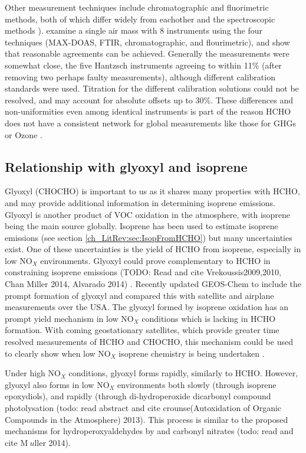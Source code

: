     Other measurement techniques include chromatographic and fluorimetric methods, both of which differ widely from eachother and the spectroscopic methods \citep{Hak2005}).
    \cite{Hak2005} examine a single air mass with 8 instruments using the four techniques (MAX-DOAS, FTIR, chromatographic, and flourimetric), and show that reasonable agreements can be achieved.
    Generally the measurements were somewhat close, the five Hantzsch instruments agreeing to within 11\% (after removing two perhaps faulty measurements), although different calibration standards were used.
    Titration for the different calibration solutions could not be resolved, and may account for absolute offsets up to 30\%.
    These differences and non-uniformities even among identical instruments is part of the reason HCHO does not have a consistent network for global measurements like those for GHGs or Ozone \citep{FortemsCheiney2012}.
    
  \subsection{Relationship with glyoxyl and isoprene}
    Glyoxyl (CHOCHO) is important to us as it shares many properties with HCHO, and may provide additional information in determining isoprene emissions.
    Glyoxyl is another product of VOC oxidation in the atmosphere, with isoprene being the main source globally.
    Isoprene has been used to estimate isoprene emissions (see section \ref{ch_LitRev:sec:IsopFromHCHO}) but many uncertainties exist.
    One of these uncertainties is the yield of HCHO from isoprene, especially in low NO$_X$ environments.
    Glyoxyl could prove complementary to HCHO in constraining isoprene emissions (TODO: Read and cite Vrekoussis2009,2010, Chan Miller 2014, Alvarado 2014) \citep{Miller2017}.
    Recently \cite{Miller2017} updated GEOS-Chem to include the prompt formation of glyoxyl and compared this with satellite and airplane measurements over the USA.
    The glyoxyl formed by isoprene oxidation has an prompt yield mechanism in low NO$_X$ conditions which is lacking in HCHO formation.
    With coming geostationary satellites, which provide greater time resolved measurements of HCHO and CHOCHO, this mechanism could be used to clearly show when low NO$_X$ isoprene chemistry is being undertaken \citep{Miller2017}.
    
    Under high NO$_X$ conditions, glyoxyl forms rapidly, similarly to HCHO.
    However, glyoxyl also forms in low NO$_X$ environments both slowly (through isoprene epoxydiols), and rapidly (through di-hydroperoxide dicarbonyl compound photolysation (todo: read abstract and cite crounse(Autoxidation of Organic Compounds in the Atmosphere) 2013).
    This process is similar to the proposed mechanisms for hydroperoxyaldehydes by \citet{Peeters2014} and carbonyl nitrates (todo: read and cite M$\:{u}$ller 2014).
    
